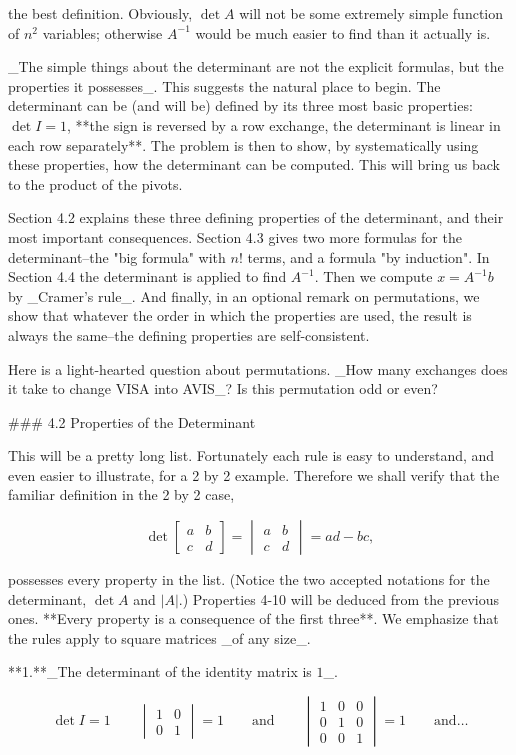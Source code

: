 the best definition. Obviously, \(\det A\) will not be some extremely simple function of \(n^{2}\) variables; otherwise \(A^{-1}\) would be much easier to find than it actually is.

_The simple things about the determinant are not the explicit formulas, but the properties it possesses_. This suggests the natural place to begin. The determinant can be (and will be) defined by its three most basic properties: \(\det I=1\), **the sign is reversed by a row exchange, the determinant is linear in each row separately**. The problem is then to show, by systematically using these properties, how the determinant can be computed. This will bring us back to the product of the pivots.

Section 4.2 explains these three defining properties of the determinant, and their most important consequences. Section 4.3 gives two more formulas for the determinant--the "big formula" with \(n!\) terms, and a formula "by induction". In Section 4.4 the determinant is applied to find \(A^{-1}\). Then we compute \(x=A^{-1}b\) by _Cramer's rule_. And finally, in an optional remark on permutations, we show that whatever the order in which the properties are used, the result is always the same--the defining properties are self-consistent.

Here is a light-hearted question about permutations. _How many exchanges does it take to change VISA into AVIS_? Is this permutation odd or even?

### 4.2 Properties of the Determinant

This will be a pretty long list. Fortunately each rule is easy to understand, and even easier to illustrate, for a 2 by 2 example. Therefore we shall verify that the familiar definition in the 2 by 2 case,

\[\det\begin{bmatrix}a&b\\ c&d\end{bmatrix}=\begin{vmatrix}a&b\\ c&d\end{vmatrix}=ad-bc,\]

possesses every property in the list. (Notice the two accepted notations for the determinant, \(\det A\) and \(|A|\).) Properties 4-10 will be deduced from the previous ones. **Every property is a consequence of the first three**. We emphasize that the rules apply to square matrices _of any size_.

**1.**_The determinant of the identity matrix is \(1\)_.

\[\det I=1\qquad\begin{vmatrix}1&0\\ 0&1\end{vmatrix}=1\qquad\text{and}\qquad\begin{vmatrix}1&0&0\\ 0&1&0\\ 0&0&1\end{vmatrix}=1\qquad\text{and}\ldots\] 